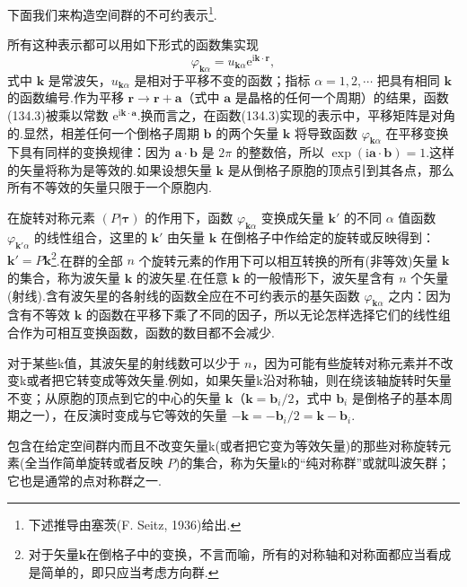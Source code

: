 下面我们来构造空间群的不可约表示\footnote{下述推导由塞茨(F. Seitz, 1936)给出.}.

所有这种表示都可以用如下形式的函数集实现
\begin{equation}
  \varphi_{\boldsymbol{k}\alpha}=u_{\boldsymbol{k}\alpha}
  \mathrm{e}^{\mathrm{i}\boldsymbol{k}\cdot\boldsymbol{r}},
\end{equation}
式中 $\boldsymbol{k}$ 是常波矢，$u_{\boldsymbol{k}\alpha}$ 是相对于平移不变的函数；指标 $\alpha=1,2,\cdots$ 把具有相同 $\boldsymbol{k}$ 的函数编号.作为平移 $\boldsymbol{r}\to\boldsymbol{r}+\boldsymbol{a}$（式中 $\boldsymbol{a}$ 是晶格的任何一个周期）的结果，函数(134.3)被乘以常数 $\mathrm{e}^{\mathrm{i}\boldsymbol{k}\cdot\boldsymbol{a}}$.换而言之，在函数(134.3)实现的表示中，平移矩阵是对角的.显然，相差任何一个倒格子周期 $\boldsymbol{b}$ 的两个矢量 $\boldsymbol{k}$ 将导致函数 $\varphi_{\boldsymbol{k}\alpha}$ 在平移变换下具有同样的变换规律：因为 $\boldsymbol{a}\cdot\boldsymbol{b}$ 是 $2\pi$ 的整数倍，所以 $\exp(\mathrm{i}\boldsymbol{a}\cdot\boldsymbol{b})=1$.这样的矢量将称为是等效的.如果设想矢量 $\boldsymbol{k}$ 是从倒格子原胞的顶点引到其各点，那么所有不等效的矢量只限于一个原胞内.

在旋转对称元素 $(P|\boldsymbol{\tau})$ 的作用下，函数 $\varphi_{\boldsymbol{k}\alpha}$ 变换成矢量 $\boldsymbol{k}'$ 的不同 $\alpha$ 值函数 $\varphi_{\boldsymbol{k}'\alpha}$ 的线性组合，这里的 $\boldsymbol{k}'$ 由矢量 $\boldsymbol{k}$ 在倒格子中作给定的旋转或反映得到：$\boldsymbol{k}'=P\boldsymbol{k}$\footnote{对于矢量$\boldsymbol{k}$在倒格子中的变换，不言而喻，所有的对称轴和对称面都应当看成是简单的，即只应当考虑方向群.}.在群的全部 $n$ 个旋转元素的作用下可以相互转换的所有(非等效)矢量 $\boldsymbol{k}$ 的集合，称为波矢量 $\boldsymbol{k}$ 的波矢星.在任意 $\boldsymbol{k}$ 的一般情形下，波矢星含有 $n$ 个矢量(射线).含有波矢星的各射线的函数全应在不可约表示的基矢函数 $\varphi_{\boldsymbol{k}\alpha}$ 之内：因为含有不等效 $\boldsymbol{k}$ 的函数在平移下乘了不同的因子，所以无论怎样选择它们的线性组合作为可相互变换函数，函数的数目都不会减少.

对于某些k值，其波矢星的射线数可以少于 $n$，因为可能有些旋转对称元素并不改变k或者把它转变成等效矢量.例如，如果矢量k沿对称轴，则在绕该轴旋转时矢量不变；从原胞的顶点到它的中心的矢量 $\boldsymbol{k}$（$\boldsymbol{k}=\boldsymbol{b}_i/2$，式中 $\boldsymbol{b}_i$ 是倒格子的基本周期之一），在反演时变成与它等效的矢量 $-\boldsymbol{k}=-\boldsymbol{b}_i/2=\boldsymbol{k}-\boldsymbol{b}_i$.

包含在给定空间群内而且不改变矢量k(或者把它变为等效矢量)的那些对称旋转元素(全当作简单旋转或者反映 $P$)的集合，称为矢量k的“纯对称群”或就叫波矢群；它也是通常的点对称群之一.

